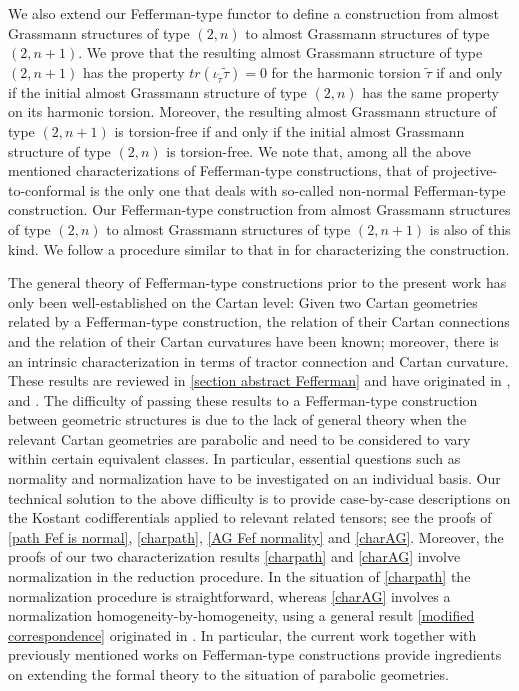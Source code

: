 \documentclass[11pt]{amsart}
\begin{document}
We also extend our Fefferman-type functor to define a construction from almost Grassmann structures of type $(2,n)$ to almost Grassmann structures of type $(2,n+1)$. We prove that the resulting almost Grassmann structure of type $(2,n+1)$ has the property $tr(\iota_{\tilde\tau}\tilde\tau)=0$ for the harmonic torsion $\tilde\tau$ if and only if the initial almost Grassmann structure of type $(2,n)$ has the same property on its harmonic torsion. Moreover, the resulting almost Grassmann structure of type $(2,n+1)$ is torsion-free if and only if the initial almost Grassmann structure of type $(2,n)$ is torsion-free. We note that, among all the above mentioned characterizations of Fefferman-type constructions, that of projective-to-conformal \cite{Ham+17} is the only one that deals with so-called non-normal Fefferman-type construction. Our Fefferman-type construction from almost Grassmann structures of type $(2,n)$ to almost Grassmann structures of type $(2,n+1)$ is also of this kind. We follow a procedure similar to that in \cite{Ham+17} for characterizing the construction.

The general theory of Fefferman-type constructions prior to the present work has only been well-established on the Cartan level: Given two Cartan geometries related by a Fefferman-type construction, the relation of their Cartan connections and the relation of their Cartan curvatures have been known; moreover, there is an intrinsic characterization in terms of tractor connection and Cartan curvature. These results are reviewed in \cref{section abstract Fefferman} and have originated in \cite{Cap06}, \cite{CGH} and \cite{Cap05}. The difficulty of passing these results to a Fefferman-type construction between geometric structures is due to the lack of general theory when the relevant Cartan geometries are parabolic and need to be considered to vary within certain equivalent classes. In particular, essential questions such as normality and normalization have to be investigated on an individual basis. Our technical solution to the above difficulty is to provide case-by-case descriptions on the Kostant codifferentials applied to relevant related tensors; see the proofs of \cref{path Fef is normal}, \cref{charpath}, \cref{AG Fef normality} and \cref{charAG}. Moreover, the proofs of our two characterization results \cref{charpath} and \cref{charAG} involve normalization in the reduction procedure. In the situation of \cref{charpath} the normalization procedure is straightforward, whereas \cref{charAG} involves a normalization homogeneity-by-homogeneity, using a general result \cref{modified correspondence} originated in \cite{Ham+17}. In particular, the current work together with previously mentioned works on Fefferman-type constructions provide ingredients on extending the formal theory to the situation of parabolic geometries.
\end{document}
